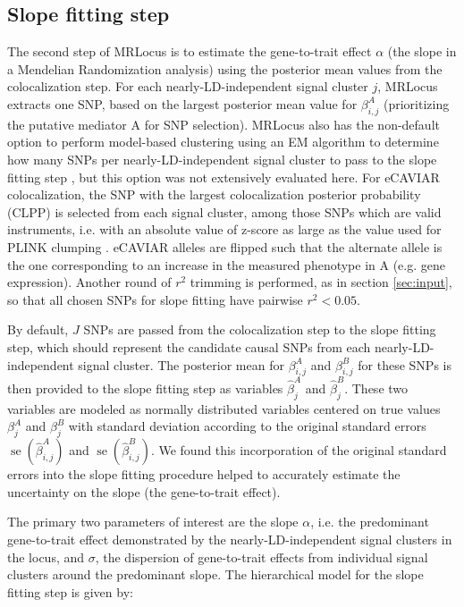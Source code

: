 \documentclass[11pt]{article}
\DeclareMathOperator{\se}{\textrm{se}}
\begin{document}
\subsection{Slope fitting step} \label{sec:slope}

The second step of MRLocus is to estimate the gene-to-trait effect $\alpha$
(the slope in a Mendelian Randomization analysis) using the posterior
mean values from the colocalization step. For each
nearly-LD-independent signal cluster $j$, MRLocus extracts one SNP,
based on the largest posterior mean value for $\beta_{i,j}^A$
(prioritizing the putative mediator A for SNP selection).
MRLocus also has the non-default option to perform model-based
clustering using an EM algorithm to determine how many SNPs per
nearly-LD-independent signal cluster to pass to the slope fitting step
\citep{mclust}, but this option was not extensively evaluated here.
For eCAVIAR colocalization, the SNP with the largest colocalization
posterior probability (CLPP) is selected from each signal cluster,
among those SNPs which are valid instruments, i.e. with an absolute
value of z-score as large as the value used for PLINK clumping
\citep{plink}.  eCAVIAR alleles are flipped such that the alternate
allele is the one corresponding to an increase in the measured
phenotype in A (e.g. gene expression). Another round of $r^2$ trimming
is performed, as in section \ref{sec:input}, so that all chosen SNPs
for slope fitting have pairwise $r^2 < 0.05$.

By default, $J$ SNPs are passed from the colocalization step to the
slope fitting step, which should represent the candidate causal SNPs
from each nearly-LD-independent signal cluster. The posterior mean for
$\beta_{i,j}^A$ and $\beta_{i,j}^B$ for these SNPs is then provided to
the slope fitting step as variables $\widehat{\beta}_j^A$ and
$\widehat{\beta}_j^B$. These two variables
are modeled as normally distributed variables centered on
true values $\beta_j^A$ and $\beta_j^B$
with standard deviation according to the original standard errors
$\se(\widehat{\beta}_{i,j}^A)$ and
$\se(\widehat{\beta}_{i,j}^B)$. We found this incorporation of the
original standard errors into the slope fitting procedure helped to
accurately estimate the uncertainty on the slope (the gene-to-trait
effect). 

The primary two parameters of interest are the slope $\alpha$, 
i.e. the predominant gene-to-trait effect demonstrated by the
nearly-LD-independent signal clusters in the locus, and $\sigma$,
the dispersion of gene-to-trait effects from individual signal clusters
around the predominant slope.
The hierarchical model for the slope fitting step is given by:
\end{document}
